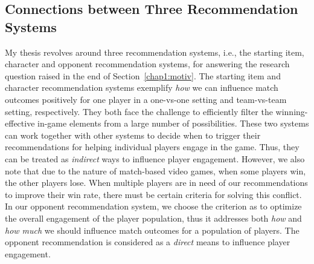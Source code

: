 




\subsection{Connections between Three Recommendation Systems}

My thesis revolves around three recommendation systems, i.e., the starting item, character and opponent recommendation systems, for answering the research question raised in the end of Section~\ref{chap1:motiv}. The starting item and character recommendation systems exemplify \textit{how} we can influence match outcomes positively for one player in a one-vs-one setting and team-vs-team setting, respectively. They both face the challenge to efficiently filter the winning-effective in-game elements from a large number of possibilities. These two systems can work together with other systems to decide when to trigger their recommendations for helping individual players engage in the game. Thus, they can be treated as \textit{indirect} ways to influence player engagement. However, we also note that due to the nature of match-based video games, when some players win, the other players lose. When multiple players are in need of our recommendations to improve their win rate, there must be certain criteria for solving this conflict. In our opponent recommendation system, we choose the criterion as to optimize the overall engagement of the player population, thus it addresses both \textit{how} and \textit{how much} we should influence match outcomes for a population of players. The opponent recommendation is considered as a \textit{direct} means to influence player engagement.

